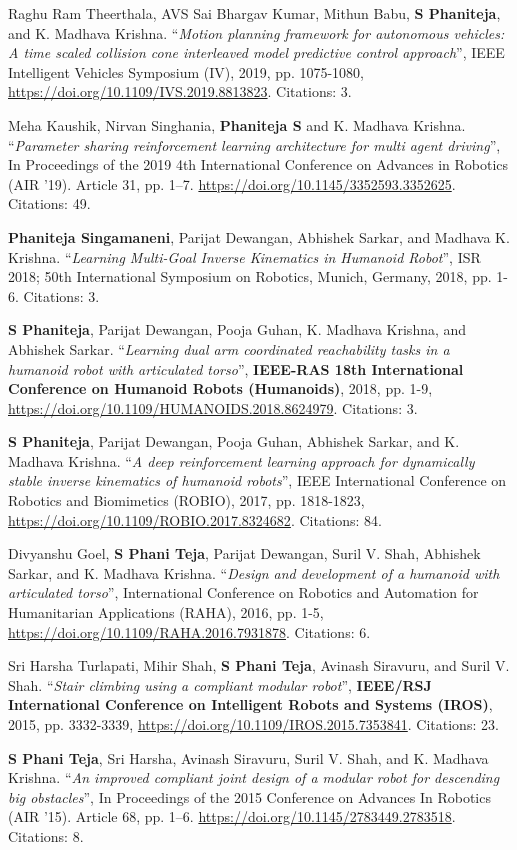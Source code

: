 \documentclass[11pt]{article}
\newcounter{descenum}
\newenvironment{descenumerate}[2]{%
  \setcounter{descenum}{#2}%
  \begin{enumerate}[
    topsep=0pt,
    itemsep=3pt,
    partopsep=0pt,
    parsep=0pt,
    label={[#1\arabic{descenum}]}
  ]
}{
  \end{enumerate}
}
\newcommand{\descitem}{%
  \item
  \addtocounter{descenum}{-1}
}
\newcommand{\bt}[1]{{\textbf{\color{teal} #1}}}
\begin{document}
\begin{descenumerate}{C}{22}
    \descitem \label{iv19} {Raghu Ram Theerthala, AVS Sai Bhargav Kumar, Mithun Babu, \textbf{S Phaniteja}, and K. Madhava Krishna. ``\textit{Motion planning framework for autonomous vehicles: A time scaled collision cone interleaved model predictive control approach}'', IEEE Intelligent Vehicles Symposium (IV), 2019, pp. 1075-1080, \url{https://doi.org/10.1109/IVS.2019.8813823}.} Citations: 3.

    \descitem \label{meha19} {Meha Kaushik, Nirvan Singhania, \textbf{Phaniteja S} and K. Madhava Krishna. ``\textit{Parameter sharing reinforcement learning architecture for multi agent driving}'', In Proceedings of the 2019 4th International Conference on Advances in Robotics (AIR '19). Article 31, pp. 1–7. \url{https://doi.org/10.1145/3352593.3352625}.} Citations: 49.

    \descitem \label{isr18} {\textbf{Phaniteja Singamaneni}, Parijat Dewangan, Abhishek Sarkar, and Madhava K. Krishna. ``\textit{Learning Multi-Goal Inverse Kinematics in Humanoid Robot}'', ISR 2018; 50th International Symposium on Robotics, Munich, Germany, 2018, pp. 1-6.} Citations: 3.

    \descitem \label{humanoids18} {\textbf{S Phaniteja}, Parijat Dewangan, Pooja Guhan, K. Madhava Krishna, and Abhishek Sarkar. ``\textit{Learning dual arm coordinated reachability tasks in a humanoid robot with articulated torso}'', \bt{IEEE-RAS 18th International Conference on Humanoid Robots (Humanoids)}, 2018, pp. 1-9, \url{https://doi.org/10.1109/HUMANOIDS.2018.8624979}.} Citations: 3.

    \descitem \label{robio} {\textbf{S Phaniteja}, Parijat Dewangan, Pooja Guhan, Abhishek Sarkar, and K. Madhava Krishna. ``\textit{A deep reinforcement learning approach for dynamically stable inverse kinematics of humanoid robots}'', IEEE International Conference on Robotics and Biomimetics (ROBIO), 2017, pp. 1818-1823, \url{https://doi.org/10.1109/ROBIO.2017.8324682}.} Citations: 84.

    \descitem \label{raha16} {Divyanshu Goel, \textbf{S Phani Teja}, Parijat Dewangan, Suril V. Shah, Abhishek Sarkar, and K. Madhava Krishna. ``\textit{Design and development of a humanoid with articulated torso}'', International Conference on Robotics and Automation for Humanitarian Applications (RAHA), 2016, pp. 1-5, \url{https://doi.org/10.1109/RAHA.2016.7931878}.} Citations: 6.

    \descitem \label{iros15} {Sri Harsha Turlapati, Mihir Shah, \textbf{S Phani Teja}, Avinash Siravuru, and Suril V. Shah. ``\textit{Stair climbing using a compliant modular robot}'', \bt{IEEE/RSJ International Conference on Intelligent Robots and Systems (IROS)}, 2015, pp. 3332-3339, \url{https://doi.org/10.1109/IROS.2015.7353841}.} Citations: 23.

    \descitem \label{air15} {\textbf{S Phani Teja}, Sri Harsha, Avinash Siravuru, Suril V. Shah, and K. Madhava Krishna. ``\textit{An improved compliant joint design of a modular robot for descending big obstacles}'', In Proceedings of the 2015 Conference on Advances In Robotics (AIR '15). Article 68, pp. 1–6. \url{https://doi.org/10.1145/2783449.2783518}.} Citations: 8.
\end{descenumerate}
\end{document}
